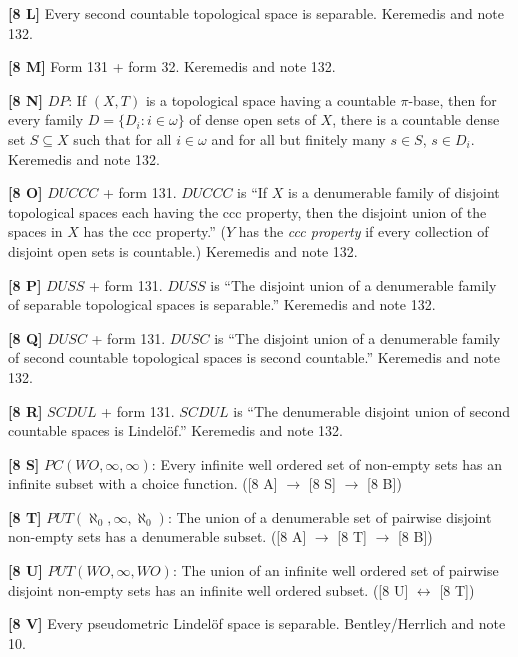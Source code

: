 \smallskip
\item{}{\bf [8 L]} Every second countable topological space is separable.
\ac{Keremedis} \cite{1998b} and note 132.
\smallskip
\item{}{\bf [8 M]} Form 131 + form 32. \ac{Keremedis} \cite{1998b} and note
132.
\smallskip
\item{}{\bf [8 N]} $DP$: If $(X,T)$ is a topological space having a
countable $\pi$-base, then for every family $D=\{D_i: i\in\omega\}$ of
dense open sets of $X$, there is a countable dense set $S\subseteq X$ such
that for all $i\in\omega$ and for all but finitely many $s\in S$,
$s\in D_i$.  \ac{Keremedis} \cite{1998b} and note 132.
\smallskip
\item{}{\bf [8 O]}  $DUCCC$ + form 131.
$DUCCC$ is ``If $X$ is a denumerable family of disjoint topological
spaces each having the ccc property, then the disjoint union of the
spaces in $X$ has the ccc property.'' ($Y$ has the {\it ccc property} if
every collection of disjoint open sets is countable.)
\ac{Keremedis} \cite{1998b} and note 132.
\smallskip
\item{}{\bf [8 P]} $DUSS$ + form 131.
$DUSS$ is ``The disjoint union of a denumerable family of separable
topological spaces is separable.'' \ac{Keremedis} \cite{1998b} and note
132.
\smallskip
\item{}{\bf [8 Q]} $DUSC$ + form 131.
$DUSC$ is ``The disjoint union of a denumerable family of second
countable topological spaces is second countable.'' \ac{Keremedis}
\cite{1998b} and note 132.
\smallskip
\item{}{\bf [8 R]} $SCDUL$ + form 131.
$SCDUL$ is ``The denumerable disjoint union of second countable
spaces is Lindel\"of.'' \ac{Keremedis} \cite{1998b} and note 132.
\smallskip
\item{}{\bf [8 S]} $PC(WO,\infty,\infty)$: Every infinite well ordered
set of non-empty sets has an infinite subset with a choice function.
([8 A] $\to$ [8 S] $\to$ [8 B])
\smallskip
\item{}{\bf [8 T]} $PUT(\aleph_0,\infty,\aleph_0)$: The union of a
denumerable set of pairwise disjoint non-empty sets has a denumerable
subset. ([8 A] $\to$ [8 T] $\to$ [8 B])
\smallskip
\item{}{\bf [8 U]} $PUT(WO,\infty,WO)$: The union of an infinite well
ordered set of pairwise disjoint non-empty sets has an infinite well
ordered subset. ([8 U] $\leftrightarrow$ [8 T])
\smallskip
\item{}{\bf [8 V]} Every pseudometric Lindel\"of space is separable.
\ac{Bentley/Herrlich} \cite{1998} and note 10.
